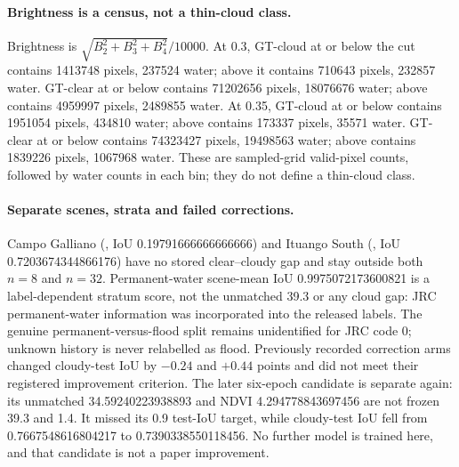 \paragraph{Brightness is a census, not a thin-cloud class.}
Brightness is $\sqrt{B_2^2+B_3^2+B_4^2}/10000$.
At 0.3, GT-cloud at or below the cut contains 1413748 pixels, 237524 water; above it contains 710643 pixels, 232857 water.
GT-clear at or below contains 71202656 pixels, 18076676 water; above contains 4959997 pixels, 2489855 water.
At 0.35, GT-cloud at or below contains 1951054 pixels, 434810 water; above contains 173337 pixels, 35571 water.
GT-clear at or below contains 74323427 pixels, 19498563 water; above contains 1839226 pixels, 1067968 water.
These are sampled-grid valid-pixel counts, followed by water counts in each bin; they do not define a thin-cloud class.

\paragraph{Separate scenes, strata and failed corrections.}
Campo Galliano (, IoU 0.19791666666666666) and Ituango South (, IoU 0.7203674344866176) have no stored clear--cloudy gap and stay outside both $n=8$ and $n=32$.
Permanent-water scene-mean IoU 0.9975072173600821 is a label-dependent stratum score, not the unmatched 39.3 or any cloud gap: JRC permanent-water information was incorporated into the released labels.
The genuine permanent-versus-flood split remains unidentified for JRC code 0; unknown history is never relabelled as flood.
Previously recorded correction arms changed cloudy-test IoU by $-0.24$ and $+0.44$ points and did not meet their registered improvement criterion.
The later six-epoch candidate is separate again: its unmatched 34.59240223938893 and NDVI 4.294778843697456 are not frozen 39.3 and 1.4.
It missed its 0.9 test-IoU target, while cloudy-test IoU fell from 0.7667548616804217 to 0.7390338550118456.
No further model is trained here, and that candidate is not a paper improvement.
